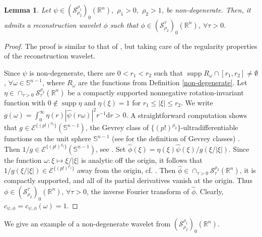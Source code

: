 \documentclass[reqno,12pt]{amsart}
\theoremstyle{plain}
\newtheorem{lemma}{Lemma}
\theoremstyle{definition}
\theoremstyle{remark}
\begin{document}
\begin{lemma} \label{lemma1} Let $ \psi \in ({\mathcal S}^{\rho_1} _ {\rho_2})_0
(\mathbb{R}^n), $ $ \rho_1 > 0,$ $ \rho_2 > 1$, be non-degenerate. Then, it admits a
reconstruction wavelet $ \phi$ such that $\phi\in ({\mathcal S}^{\tau} _ {\rho_2})_0 (\mathbb{R}^n)$, $\forall \tau>0$.
\end{lemma}
\begin{proof}
The proof is similar to that of \cite[Proposition 5.1]{vindas-pilipovic-2},
but taking care of the regularity properties of the reconstruction wavelet.

Since $\psi$ is non-degenerate, there are $0<r_{1}<r_{2}$ such that $
\operatorname*{supp} R_{\omega} \cap [r_{1},r_{2}]\neq\emptyset$, $\forall \omega\in\mathbb{S}^{n-1}$,
where $R_{\omega}$ are the functions from Definition \ref{non-degenerate}.
Let $\eta\in  \cap_{\tau>0} {\mathcal S}_{\tau} ^ {\rho_2}(\mathbb{R}^n)$
be a compactly supported nonnegative rotation-invariant function with $0\notin \operatorname*{supp} \eta$
and $\eta(\xi)=1$ for $r_{1}\leq |\xi|\leq r_{2}$. We write
$g(\omega)=\int_{0}^{\infty}\eta(r)|\hat{\psi}(r\omega)|^{2}r^{-1}\mathrm{d}r>0.$
A straightforward computation shows that $g\in \mathcal{E}^{\{(p!)^{\rho_{2}}\}}(\mathbb{S}^{n-1})$,
the Gevrey class of $\{(p!)^{\rho_{2}}\}$-ultradifferentiable functions on the unit sphere $\mathbb{S}^{n-1}$
(see \cite{K} for the definition of  Gevrey classes) . Then $ 1/g \in \mathcal{E}^{\{(p!)^{\rho_{2}}\}}(\mathbb{S}^{n-1})$, see \cite[Lemma 1]{K2}.
Set $\hat{\phi}(\xi)= \eta (\xi)\hat{\psi}(\xi)/g(\xi/|\xi|)$.
Since the function $ \omega: \xi \mapsto \xi/|\xi| $ is analytic
off the origin, it follows that $1/g(\xi/|\xi|) \in \mathcal{E}^{\{(p!)^{\rho_{2}}\}} $ away from
the origin, cf. \cite[Theorem 8.2.4]{Horm}.
Then $\hat{\phi}\in \cap_{\tau>0} {\mathcal S}_{\tau} ^ {\rho_2}(\mathbb{R}^n)$,
it is compactly supported, and all of its partial derivatives vanish at the origin.
Thus $\phi\in ({\mathcal S}^{\tau} _ {\rho_2})_0 (\mathbb{R}^n)$, $\forall \tau>0$,
the inverse Fourier transform of $\hat{\phi}$. Clearly, $c_{\psi,\phi}=c_{\psi,\phi}(\omega)=1$.
\end{proof}

\par

We give an example of a non-degenerate wavelet from $(\mathcal{S}^{\rho_{1}}_{\rho_2})_{0}(\mathbb{R}^{n})$.
\end{document}
